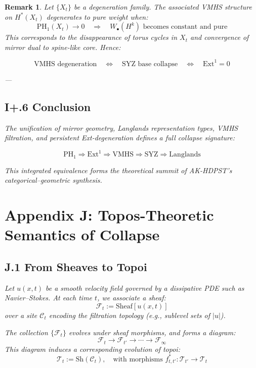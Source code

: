 \documentclass[11pt]{article}
\newtheorem{remark}[theorem]{Remark}
\begin{document}
\begin{remark}
Let \( \{X_t\} \) be a degeneration family. The associated VMHS structure on \( H^*(X_t) \) degenerates to pure weight when:
\[
\mathrm{PH}_1(X_t) \to 0 \quad \Rightarrow \quad W_\bullet(H^k) \text{ becomes constant and pure}
\]
This corresponds to the disappearance of torus cycles in \( X_t \) and convergence of mirror dual to spine-like core. Hence:

\[
\text{VMHS degeneration} \quad \Leftrightarrow \quad \text{SYZ base collapse} \quad \Leftrightarrow \quad \mathrm{Ext}^1 = 0
\]

---

\subsection*{I+.6 Conclusion}

The unification of mirror geometry, Langlands representation types, VMHS filtration, and persistent Ext-degeneration defines a full collapse signature:

\[
\boxed{
\mathrm{PH}_1 \Rightarrow \mathrm{Ext}^1 \Rightarrow \text{VMHS} \Rightarrow \text{SYZ} \Rightarrow \text{Langlands}
}
\]

This integrated equivalence forms the theoretical summit of AK-HDPST's categorical–geometric synthesis.



\section*{Appendix J: Topos-Theoretic Semantics of Collapse}

\subsection*{J.1 From Sheaves to Topoi}

Let $u(x,t)$ be a smooth velocity field governed by a dissipative PDE such as Navier–Stokes.  
At each time $t$, we associate a sheaf:
\[
\mathcal{F}_t := \mathrm{Sheaf}[u(x,t)]
\]
over a site $\mathcal{C}_t$ encoding the filtration topology (e.g., sublevel sets of $|u|$).

The collection $\{\mathcal{F}_t\}$ evolves under sheaf morphisms, and forms a diagram:
\[
\mathcal{F}_t \longrightarrow \mathcal{F}_{t'} \longrightarrow \cdots \longrightarrow \mathcal{F}_\infty
\]
This diagram induces a corresponding evolution of topoi:
\[
\mathscr{T}_t := \mathrm{Sh}(\mathcal{C}_t), \quad \text{with morphisms } f_{t,t'}^* : \mathscr{T}_{t'} \to \mathscr{T}_t
\]


\end{remark}
\end{document}
